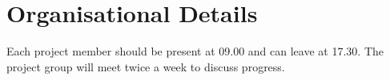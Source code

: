 \documentclass{memoir}
\begin{document}
\chapter{Organisational Details}
Each project member should be present at 09.00 and can leave at 17.30. The project group will meet twice a week to discuss progress.
\end{document}
